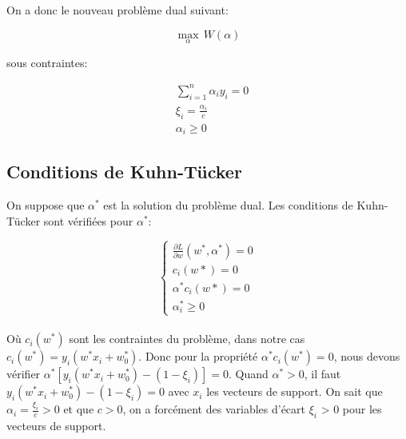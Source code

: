 \documentclass{article}
\begin{document}
\begin{multicols}{2}
On a donc le nouveau problème dual suivant:

\begin{equation}
    \operatorname*{max}_{\alpha} \, W(\alpha)
\end{equation}

sous contraintes:

\begin{equation}
    \begin{split}
        & \sum_{i = 1}^n \alpha_i y_i = 0 \\
        & \xi_i = \frac{\alpha_i}{c} \\
        & \alpha_i \geq 0
    \end{split}
\end{equation}

\subsection{Conditions de Kuhn-Tücker}\label{subsec:ex25}

%
%
%

On suppose que $\alpha^*$ est la solution du problème dual. Les conditions de
Kuhn-Tücker sont vérifiées pour $\alpha^*$:

$$\begin{cases}
    \frac{\partial L}{\partial w}(w^*, \alpha^*) = 0  \\
    c_i (w *) = 0 \\
    \alpha^* c_i (w *) = 0 \\
    \alpha_i^* \geqslant 0
\end{cases}$$
\\

Où $c_i(w^*)$ sont les contraintes du problème, dans notre cas
$c_i(w^*) = y_i(w^* x_i + w_0^*)$. Donc pour la propriété
$\alpha^* c_i(w^*) = 0$, nous devons vérifier
$\alpha^* [y_i(w^* x_i + w_0^*) - (1 - \xi_i)] = 0$. Quand $\alpha^* > 0$,
il faut $y_i(w^* x_i + w_0^*) - (1 - \xi_i) = 0$ avec $x_i$
les vecteurs de support. On sait que $\alpha_i = \frac{\xi_i}{c} > 0$ et que
$c > 0$, on a forcément des variables d'écart $\xi_i$ > 0 pour les vecteurs de
support.


\end{multicols}
\end{document}

